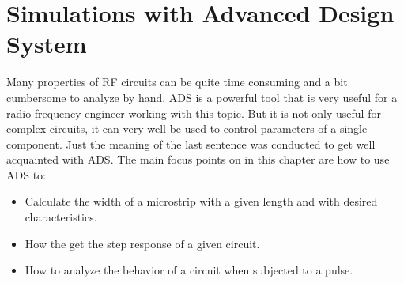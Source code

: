 \documentclass[report.tex]{subfiles}
\begin{document}
\pagebreak \section{Simulations with Advanced Design System}
Many properties of RF circuits can be quite time consuming and a bit cumbersome to analyze by hand. ADS is a powerful tool that is very useful for a radio frequency engineer working with this topic. But it is not only useful for complex circuits, it can very well be used to control parameters of a single component.
Just the meaning of the last sentence was conducted to get well acquainted with ADS. The main focus points on in this chapter are how to use ADS to:
\begin{itemize}
	\item Calculate the width of a microstrip with a given length and with desired characteristics.
	\item How the get the step response of a given circuit.
	\item How to analyze the behavior of a circuit when subjected to a pulse.
\end{itemize}







\end{document}
